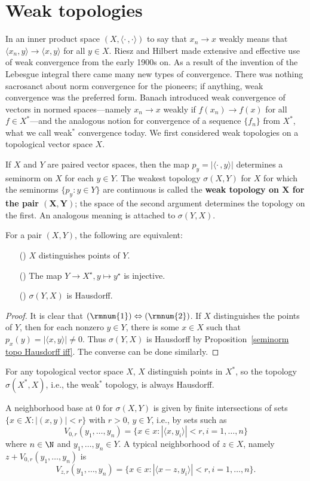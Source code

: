\section{Weak topologies}
In an inner product space $(X,\langle\cdot\,,\cdot\rangle)$ to say that $x_n\to x$ weakly means that $\langle x_n,y\rangle\to\langle x,y\rangle$ for all $y\in X$. Riesz and Hilbert made extensive and effective use of weak convergence from the early 1900s on. As a result of the invention of the Lebesgue integral there came many new types of convergence. There was nothing sacrosanct about norm convergence for the pioneers; if anything, weak convergence was the preferred form. Banach introduced weak convergence of vectors in normed spaces---namely $x_n\to x$ weakly if $f(x_n)\to f(x)$ for all $f\in X^*$---and the analogous notion for convergence of a sequence $\{f_n\}$ from $X^*$, what we call weak$^*$ convergence today. We first considered weak topologies on a topological vector space $X$.
\begin{definition}
If $X$ and $Y$ are paired vector spaces, then the map $p_y=|\langle\cdot\,,y\rangle|$ determines a seminorm on $X$ for each $y\in Y$. The weakest topology $\sigma(X,Y)$ for $X$ for which the seminorms $\{p_y:y\in Y\}$ are continuous is called the \textbf{weak topology on $\bm{X}$ for the pair $\bm{(X,Y)}$}; the space of the second argument determines the topology on the first. An analogous meaning is attached to $\sigma(Y,X)$.
\end{definition}
\begin{proposition}\label{weak topo Hausdorff iff}
For a pair $(X,Y)$, the following are equivalent:
\begin{itemize}
\item[(\rmnum{1})] $X$ distinguishes points of $Y$.
\item[(\rmnum{2})] The map $Y\to X^{\star},y\mapsto y^{\star}$ is injective.
\item[(\rmnum{3})] $\sigma(Y,X)$ is Hausdorff.
\end{itemize}
\end{proposition}
\begin{proof}
It is clear that $(\rmnum{1})\Leftrightarrow(\rmnum{2})$. If $X$ distinguishes the points of $Y$, then for each nonzero $y\in Y$, there is some $x\in X$ such that $p_x(y)=|\langle x,y\rangle|\neq 0$. Thus $\sigma(Y,X)$ is Hausdorff by Proposition~\ref{seminorm topo Hausdorff iff}. The converse can be done similarly.
\end{proof}
\begin{corollary}\label{weak star topo is Hausdorff}
For any topological vector space $X$, $X$ distinguish points in $X^*$, so the topology $\sigma(X^*,X)$, i.e., the weak$^*$ topology, is always Hausdorff.
\end{corollary}
A neighborhood base at $0$ for $\sigma(X,Y)$ is given by finite intersections of sets $\{x\in X:|(x,y)|<r\}$ with $r>0$, $y\in Y$, i.e., by sets such as
\[V_{0,r}(y_1,\dots,y_n)=\{x\in x:|\langle x,y_i\rangle|<r,i=1,\dots,n\}\]
where $n\in\N$ and $y_1,\dots,y_n\in Y$. A typical neighborhood of $z\in X$, namely $z+V_{0,r}(y_1,\dots,y_n)$ is
\[V_{z,r}(y_1,\dots,y_n)=\{x\in x:|\langle x-z,y_i\rangle|<r,i=1,\dots,n\}.\]

